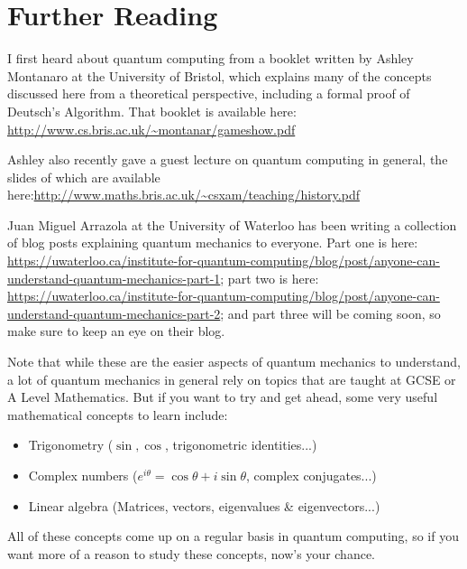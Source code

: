 \documentclass[twocolumn]{article}
\begin{document}
\section{Further Reading}

I first heard about quantum computing from a booklet written by Ashley Montanaro at the University of Bristol, which explains many of the concepts discussed here from a theoretical perspective, including a formal proof of Deutsch's Algorithm. That booklet is available here: \url{http://www.cs.bris.ac.uk/~montanar/gameshow.pdf}

Ashley also recently gave a guest lecture on quantum computing in general, the slides of which are available here:\url{http://www.maths.bris.ac.uk/~csxam/teaching/history.pdf}

Juan Miguel Arrazola at the University of Waterloo has been writing a collection of blog posts explaining quantum mechanics to everyone. Part one is here: \url{https://uwaterloo.ca/institute-for-quantum-computing/blog/post/anyone-can-understand-quantum-mechanics-part-1}; part two is here: \url{https://uwaterloo.ca/institute-for-quantum-computing/blog/post/anyone-can-understand-quantum-mechanics-part-2}; and part three will be coming soon, so make sure to keep an eye on their blog.

Note that while these are the easier aspects of quantum mechanics to understand, a lot of quantum mechanics in general rely on topics that are taught at GCSE or A Level Mathematics. But if you want to try and get ahead, some very useful mathematical concepts to learn include:

\begin{itemize}
\item Trigonometry ($\sin, \cos$, trigonometric identities...)
\item Complex numbers ($e^{i\theta} = \cos\theta + i\sin\theta$, complex conjugates...)
\item Linear algebra (Matrices, vectors, eigenvalues \& eigenvectors...)
\end{itemize}

All of these concepts come up on a regular basis in quantum computing, so if you want more of a reason to study these concepts, now's your chance.
\end{document}
